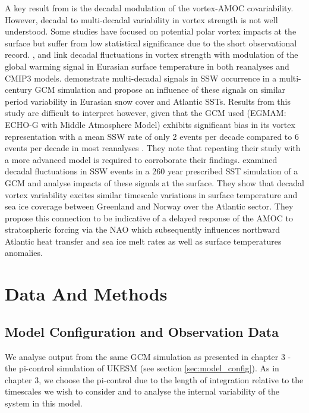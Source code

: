 A key result from \cite{reichlerStratospheric2012b} is the decadal modulation of the vortex-AMOC covariability. However, decadal to multi-decadal variability in vortex strength is not well understood. Some studies have focused on potential polar vortex impacts at the surface but suffer from low statistical significance due to the short observational record. \cite{garfinkelStratospheric2017b}, \cite{garfinkelEffect2015b} and \cite{cohenDecadal2009b} link decadal fluctuations in vortex strength with modulation of the global warming signal in Eurasian surface temperature in both reanalyses and CMIP3 models. \cite{schimankeMultidecadal2011b} demonstrate multi-decadal signals in SSW occurrence in a multi-century GCM simulation and propose an influence of these signals on similar period variability in Eurasian snow cover and Atlantic SSTs. Results from this study are difficult to interpret however, given that the GCM used (EGMAM: ECHO‐G with Middle Atmosphere Model) exhibits significant bias in its vortex representation with a mean SSW rate of only 2 events per decade compared to 6 events per decade in most reanalyses \citep{ayarzaguenaRepresentation2019a}. They note that repeating their study with a more advanced model is required to corroborate their findings. \cite{manziniStratospheretroposphere2012b} examined decadal fluctuations in SSW events in a 260 year prescribed SST simulation of a GCM and analyse impacts of these signals at the surface. They show that decadal vortex variability excites similar timescale variations in surface temperature and sea ice coverage between Greenland and Norway over the Atlantic sector. They propose this connection to be indicative of a delayed response of the AMOC to stratospheric forcing via the NAO which  subsequently influences northward Atlantic heat transfer and sea ice melt rates as well as surface temperatures anomalies. 

\section{Data And Methods}
\subsection{Model Configuration and Observation Data}

We analyse output from the same GCM simulation as presented in chapter 3 - the pi-control simulation of UKESM (see section \ref{sec:model_config}). As in chapter 3, we choose the pi-control due to the length of integration relative to the timescales we wish to consider and to analyse the internal variability of the system in this model. 

